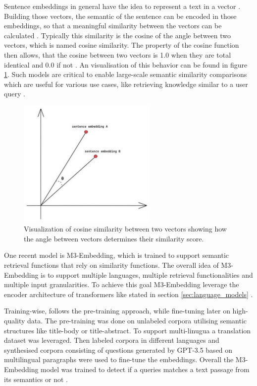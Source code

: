 \documentclass[a4paper,oneside,bibliography=totoc]{scrbook}
\begin{document}
Sentence embeddings in general have the idea to represent a text in a vector \cite{Singhal2001}. Building those vectors, the semantic of the sentence can be encoded in those embeddings, so that a meaningful similarity between the vectors can be calculated \cite{Reimers2019}. Typically this similarity is the cosine of the angle between two vectors, which is named cosine similarity. The property of the cosine function then allows, that the cosine between two vectors is 1.0 when they are total identical and 0.0 if not \cite{Singhal2001}. An visualisation of this behavior can be found in figure \ref{fig:cosine_similarity}. Such models are critical to enable large-scale semantic similarity comparisons which are useful for various use cases, like retrieving knowledge similar to a user query \cite{Reimers2019,Gao2024}.

\begin{figure}[t]
  \centering
  \includegraphics[width=0.6\textwidth]{figures/cosine_similarity.jpeg}
  \caption{Visualization of cosine similarity between two vectors showing how the angle between vectors determines their similarity score. \cite{Leys2022}}
  \label{fig:cosine_similarity}
\end{figure}

One recent model is M3-Embedding, which is trained to support semantic retrieval functions that rely on similarity functions. The overall idea of M3-Embedding is to support multiple languages, multiple retrieval functionalities and multiple input granularities. To achieve this goal M3-Embedding leverage the encoder architecture of transformers like stated in section \ref{sec:language_models} \cite{Chen2024}.

Training-wise, \citet{Chen2024} follows the pre-training approach, while fine-tuning later on high-quality data. The pre-training was done on unlabeled corpora utilising semantic structures like title-body or title-abstract. To support multi-linugua a translation dataset was leveraged. Then labeled corpora in different languages and synthesised corpora consisting of questions generated by \ac{GPT}-3.5 based on multilingual paragraphs were used to fine-tune the embeddings. Overall the M3-Embedding model was trained to detect if a queries matches a text passage from its semantics or not \cite{Chen2024}.
\end{document}
